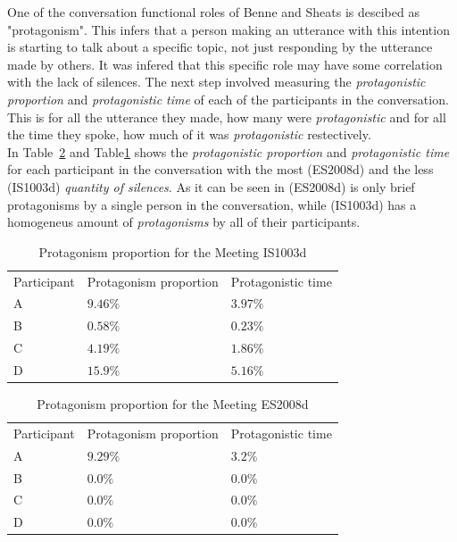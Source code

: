 One of the conversation functional roles of Benne and Sheats is descibed as "protagonism". This infers that a person making an utterance with this intention is starting to talk about a specific topic, not just responding by the utterance made by others. It was infered that this specific role may have some correlation with the lack of silences. The next step involved measuring the \textit{protagonistic proportion} and \textit{protagonistic time} of each of the participants in the conversation. This is for all the utterance they made, how many were \textit{protagonistic} and for all the time they spoke, how much of it was \textit{protagonistic} restectively.\\

In Table~\ref{table:res_ES2008d} and Table\ref{table:res_IS1003d} shows the \textit{protagonistic proportion} and \textit{protagonistic time} for each participant in the conversation with the most (ES2008d) and the less (IS1003d) \textit{quantity of silences}. As it can be seen in (ES2008d) is only brief protagonisms by a single person in the conversation, while (IS1003d) has a homogeneus amount of \textit{protagonisms} by all of their participants.\\

\begin{table}[]
    \begin{tabular}{lll}
    Participant & Protagonism proportion & Protagonistic time \\
    A           & $9.46\%$                & $3.97\%$            \\
    B           & $0.58\%$                & $0.23\%$            \\
    C           & $4.19\%$                & $1.86\%$            \\
    D           & $15.9\%$                & $5.16\%$           
    \end{tabular}
    \caption{Protagonism proportion for the Meeting IS1003d}
    \label{table:res_IS1003d}
\end{table}

\begin{table}[]
    \begin{tabular}{lll}
    Participant & Protagonism proportion & Protagonistic time \\
    A           & $9.29\%$               & $3.2\%$            \\
    B           & $0.0\%$                & $0.0\%$            \\
    C           & $0.0\%$                & $0.0\%$            \\
    D           & $0.0\%$                & $0.0\%$           
    \end{tabular}
    \caption{Protagonism proportion for the Meeting ES2008d}
    \label{table:res_ES2008d}
\end{table}

